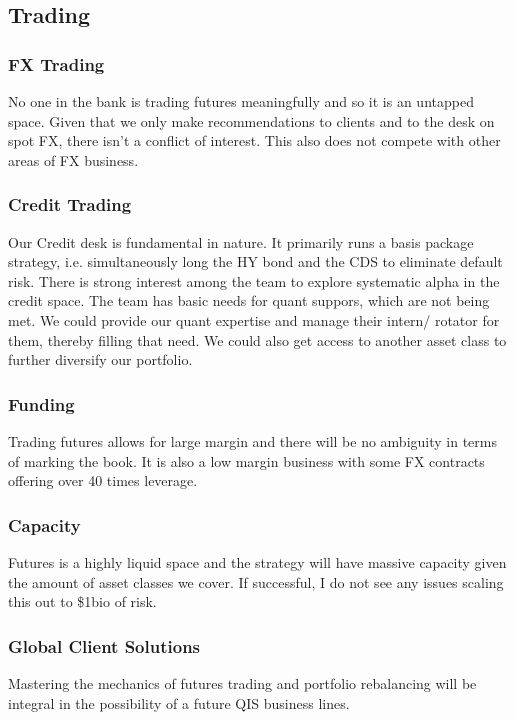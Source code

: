 \documentclass{article}
\begin{document}
\subsection{Trading}
\subsubsection{FX Trading}
No one in the bank is trading futures meaningfully and so it is an untapped space. Given that we only make recommendations to clients and to the desk on spot FX, there isn't a conflict of interest. This also does not compete with other areas of FX business. 

\subsubsection{Credit Trading}
Our Credit desk is fundamental in nature. It primarily runs a basis package strategy, i.e. simultaneously long the HY bond and the CDS to eliminate default risk. There is strong interest among the team to explore systematic alpha in the credit space. The team has basic needs for quant suppors, which are not being met. We could provide our quant expertise and manage their intern/ rotator for them, thereby filling that need. We could also get access to another asset class to further diversify our portfolio.


\subsubsection{Funding}
Trading futures allows for large margin and there will be no ambiguity in terms of marking the book. It is also a low margin business with some FX contracts offering over 40 times leverage.

\subsubsection{Capacity}
Futures is a highly liquid space and the strategy will have massive capacity given the amount of asset classes we cover. If successful, I do not see any issues scaling this out to \$1bio of risk.

\subsubsection{Global Client Solutions}
Mastering the mechanics of futures trading and portfolio rebalancing will be integral in the possibility of a future QIS business lines.
\end{document}
